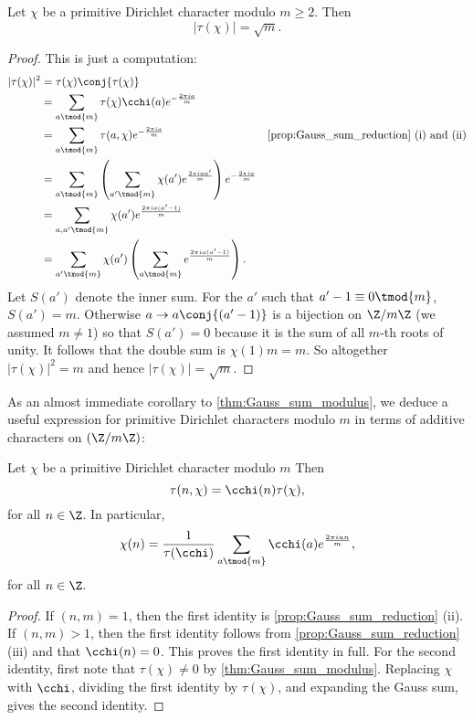         \begin{theorem}\label{thm:Gauss_sum_modulus}
          Let $\chi$ be a primitive Dirichlet character modulo $m \ge 2$. Then
          \[
            |\tau(\chi)| = \sqrt{m}.
          \]
        \end{theorem}
        \begin{proof}
          This is just a computation:
          \begin{align*}
            |\tau(\chi)|^{2} &= \tau(\chi)\conj{\tau(\chi)} \\
            &= \sum_{a \tmod{m}}\tau(\chi)\cchi(a)e^{-\frac{2\pi ia}{m}} \\
            &=  \sum_{a \tmod{m}}\tau(a,\chi)e^{-\frac{2\pi ia}{m}} & \text{\cref{prop:Gauss_sum_reduction} (i) and (ii)} \\
            &= \sum_{a \tmod{m}}\left(\sum_{a' \tmod{m}}\chi(a')e^{\frac{2\pi iaa'}{m}}\right)e^{-\frac{2\pi ia}{m}} \\
            &= \sum_{a,a' \tmod{m}}\chi(a')e^{\frac{2\pi ia(a'-1)}{m}} \\
            &= \sum_{a' \tmod{m}}\chi(a')\left(\sum_{a \tmod{m}}e^{\frac{2\pi ia(a'-1)}{m}}\right).
          \end{align*}
          Let $S(a')$ denote the inner sum. For the $a'$ such that $a'-1 \equiv 0 \tmod{m}$, $S(a') = m$. Otherwise $a \to a\conj{(a'-1)}$ is a bijection on $\Z/m\Z$ (we assumed $m \neq 1$) so that $S(a') = 0$ because it is the sum of all $m$-th roots of unity. It follows that the double sum is $\chi(1)m = m$. So altogether $|\tau(\chi)|^{2} = m$ and hence $|\tau(\chi)| = \sqrt{m}$.
        \end{proof}

        As an almost immediate corollary to \cref{thm:Gauss_sum_modulus}, we deduce a useful expression for primitive Dirichlet characters modulo $m$ in terms of additive characters on $(\Z/m\Z)$:

        \begin{corollary}\label{cor:gauss_sum_primitive_formula}
          Let $\chi$ be a primitive Dirichlet character modulo $m$ Then
          \[
            \tau(n,\chi) = \cchi(n)\tau(\chi),
          \]
          for all $n \in \Z$. In particular,
          \[
            \chi(n) = \frac{1}{\tau(\cchi)}\sum_{a \tmod{m}}\cchi(a)e^{\frac{2\pi ian}{m}},
          \]
          for all $n \in \Z$.
        \end{corollary}
        \begin{proof}
          If $(n,m) = 1$, then the first identity is \cref{prop:Gauss_sum_reduction} (ii). If $(n,m) > 1$, then the first identity follows from \cref{prop:Gauss_sum_reduction} (iii) and that $\cchi(n) = 0$. This proves the first identity in full. For the second identity, first note that $\tau(\chi) \neq 0$ by \cref{thm:Gauss_sum_modulus}. Replacing $\chi$ with $\cchi$, dividing the first identity by $\tau(\chi)$, and expanding the Gauss sum, gives the second identity.
        \end{proof}

